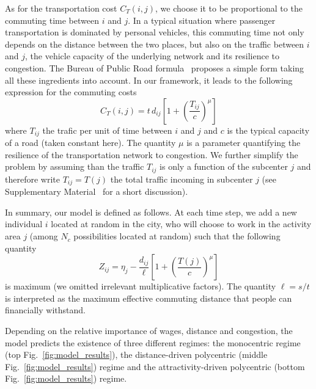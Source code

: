 As for the transportation cost $C_T(i,j)$, we choose it to be
proportional to the commuting time between $i$ and $j$. In a typical
situation where passenger transportation is dominated by personal
vehicles, this commuting time not only depends on the distance between
the two places, but also on the traffic between $i$ and $j$, the vehicle capacity of
the underlying network and its resilience to congestion. The Bureau of
Public Road formula~\cite{Branston:1976} proposes a simple form taking
all these ingredients into account. In our framework, it leads to the following expression for the 
commuting costs
%
\begin{equation}
C_T(i,j) =  t\, d_{ij} \left[ 1 + \left( \frac{T_{ij}}{c} \right)^{\mu} \right]
\end{equation}
%
where $T_{ij}$ the trafic per unit of time between $i$ and $j$ and $c$
is the typical capacity of a road (taken constant here). The quantity
$\mu$ is a parameter quantifying the resilience of the transportation
network to congestion. We further simplify the problem by assuming
than the traffic $T_{ij}$ is only a function of the subcenter $j$ and
therefore write $T_{ij}=T(j)$ the total traffic incoming in subcenter
$j$ (see Supplementary Material~\cite{SM} for a short discussion).

In summary, our model is defined as follows. At each time step, we add
a new individual $i$ located at random in the city, who will
choose to work in the activity area $j$ (among $N_c$ possibilities
located at random) such that the following quantity
%
\begin{equation}
Z_{ij} = \eta_j - \frac{d_{ij}}{\ell} \left[ 1 + \left( \frac{T(j)}{c} \right)^{\mu} \right]
\label{eq:cost_function}
\end{equation}
%
is maximum (we omitted irrelevant multiplicative factors). The quantity $\ell = s/t$ is interpreted as the maximum effective
commuting distance that people can financially withstand. 


Depending on the relative importance of wages, distance and congestion, the
model predicts the existence of three different regimes: the monocentric
regime (top Fig.~\ref{fig:model_results}), the distance-driven polycentric (middle Fig.~\ref{fig:model_results}) regime
and the attractivity-driven polycentric (bottom Fig.~\ref{fig:model_results}) regime. 


